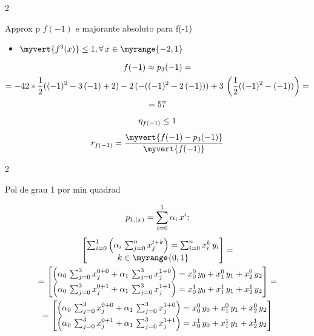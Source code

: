 \documentclass["CN_A-Tests_Resolutions.tex"]{subfiles}
\begin{document}
\begin{questionBox}2{} %

  Approx p \(f(-1)\) e majorante absoluto para f(-1)
  \begin{itemize}
    \item \(\myvert{f^{3}(x)}\leq 1, \forall\,x\in\myrange{-2,1}\)
  \end{itemize}

  \answer{}

  \begin{gather*}
    f(-1)
    \approx p_3(-1)
    = \\
    = -42*\frac{1}{2}( (-1)^2 -3\,(-1) +2)
    - 2\,(-( (-1)^2-2\,(-1)))
    + 3\,\left(\frac{1}{2}( (-1)^2-(-1) )\right)
    = \\
    = 57
    \\[1ex]
    \eta_{f(-1)} \leq 1
    \\[1ex]
    r_{f(-1)}
    = \frac
    { \myvert{f(-1)-p_3(-1)} }
    { \myvert{f(-1)} }
  \end{gather*}

\end{questionBox}

\begin{questionBox}2{} %

  Pol de grau 1 por min quadrad

  \answer{}

  \begin{gather*}
    p_{1,(x)} 
    = \sum_{i=0}^1{\alpha_i\,x^i}
    ; \\[1ex]
    \begin{bmatrix}
      \sum_{i=0}^1{\left(
          \alpha_i\,\sum_{j=0}^{n}{x_{j}^{i+k}}
      \right)}
      = \sum_{i=0}^{n}{x_i^k\,y_i}
      \\
      k\in\myrange{0,1}
    \end{bmatrix}
    = \\
    = \begin{bmatrix}
      \left(
        \alpha_0\,\sum_{j=0}^{3}{x_{j}^{0+0}}
        +\alpha_1\,\sum_{j=0}^{3}{x_{j}^{1+0}}
      \right)
      = x_0^0\,y_0
      + x_1^0\,y_1
      + x_2^0\,y_2
      \\
      \left(
        \alpha_0\,\sum_{j=0}^{3}{x_{j}^{0+1}}
        +\alpha_1\,\sum_{j=0}^{3}{x_{j}^{1+1}}
      \right)
      = x_0^1\,y_0
      + x_1^1\,y_1
      + x_2^1\,y_2
    \end{bmatrix}
    = \\
    = \begin{bmatrix}
      \left(
        \alpha_0\,\sum_{j=0}^{3}{x_{j}^{0+0}}
        +\alpha_1\,\sum_{j=0}^{3}{x_{j}^{1+0}}
      \right)
      = x_0^0\,y_0
      + x_1^0\,y_1
      + x_2^0\,y_2
      \\
      \left(
        \alpha_0\,\sum_{j=0}^{3}{x_{j}^{0+1}}
        +\alpha_1\,\sum_{j=0}^{3}{x_{j}^{1+1}}
      \right)
      = x_0^1\,y_0
      + x_1^1\,y_1
      + x_2^1\,y_2
    \end{bmatrix}
  \end{gather*}

\end{questionBox}
\end{document}
